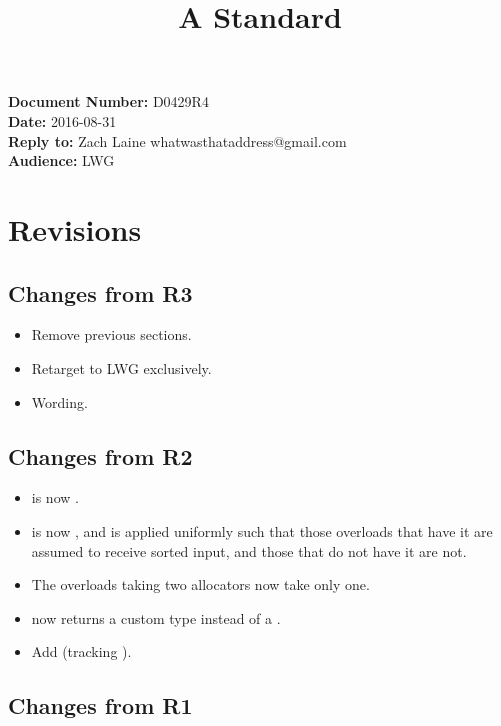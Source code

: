 \documentclass{article}
\begin{document}
\title{\textbf{\Large A Standard }}
\date{}
{\let\newpage\relax\maketitle}

\noindent\textbf{Document Number:} D0429R4\\
\textbf{Date:} 2016-08-31\\
\textbf{Reply to:} Zach Laine whatwasthataddress@gmail.com\\
\textbf{Audience:} LWG

\section{Revisions}

\label{sec:revisions}

\subsection{Changes from R3}

\begin{itemize}
  \item Remove previous sections.
  \item Retarget to LWG exclusively.
  \item Wording.
\end{itemize}

\subsection{Changes from R2}

\begin{itemize}
  \item {} is now .
  \item {} is now , and
    is applied uniformly such that those overloads that have it are assumed to
    receive sorted input, and those that do not have it are not.
  \item The overloads taking two allocators now take only one.
  \item {} now returns a custom type instead of a .
  \item Add  (tracking ).
\end{itemize}

\subsection{Changes from R1}
\end{document}
